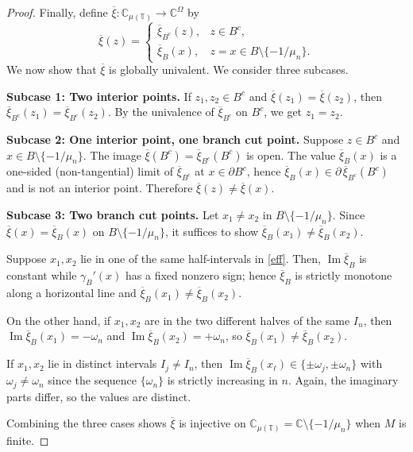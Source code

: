 \documentclass[10pt,a4paper]{amsart}
\numberwithin{equation}{section}
\begin{document}
\begin{proof}
Finally, define $\overline{\xi}:\mathbb{C}_{\mu(\mathbb{T})} \to \mathbb{C}^{\Omega}$ by
 $$
 \overline{\xi}(z)=
 \begin{cases}
 \overline{\xi}_{B^c}(z), & z\in B^c,\\[2pt]
 \overline{\xi}_B(x), & z=x\in B\setminus\{-1/\mu_n\}.
 \end{cases}
 $$
We now show that $\overline{\xi}$ is globally univalent. We consider three subcases.
\smallskip

\noindent\textbf{Subcase 1: Two interior points.}
If $z_1,z_2\in B^c$ and $\overline{\xi}(z_1)=\overline{\xi}(z_2)$, then
$\overline{\xi}_{B^c}(z_1)=\overline{\xi}_{B^c}(z_2)$. By the univalence of $\overline{\xi}_{B^c}$ on
$B^c$, we get $z_1=z_2$.
\smallskip

\noindent\textbf{Subcase 2: One interior point, one branch cut point.}
Suppose $z\in B^c$ and $x\in B\setminus\{-1/\mu_n\}$.
The image $\overline{\xi}(B^c)=\overline{\xi}_{B^c}(B^c)$ is open.
The value $\overline{\xi}_B(x)$ is a one-sided (non-tangential) limit of $\overline{\xi}_{B^c}$
at $x\in\partial B^c$,
hence $\overline{\xi}_B(x)\in\partial\,\overline{\xi}_{B^c}(B^c)$ and is not an interior point.
Therefore $\overline{\xi}(z)\neq \overline{\xi}(x)$.
\smallskip

\noindent\textbf{Subcase 3: Two branch cut points.}
Let $x_1\neq x_2$ in $B\setminus\{-1/\mu_n\}$. Since $\overline{\xi}(x)=\overline{\xi}_B(x)$ on
$B\setminus\{-1/\mu_n\}$, it suffices to show $\overline{\xi}_B(x_1)\neq \overline{\xi}_B(x_2)$.

Suppose $x_1,x_2$ lie in one of the same half-intervals in \eqref{eff}.
Then, $\operatorname{Im} \overline{\xi}_B$ is constant while $\gamma_B'(x)$ has a fixed nonzero sign;
 hence $\overline{\xi}_B$ is strictly monotone along a horizontal line and
$\overline{\xi}_B(x_1)\neq \overline{\xi}_B(x_2)$.

On the other hand, if $x_1,x_2$ are in the two different halves of the same $I_n$,
then $\operatorname{Im} \overline{\xi}_B(x_1)=-\omega_n$ and $\operatorname{Im} \overline{\xi}_B(x_2)=+\omega_n$, so
$\overline{\xi}_B(x_1)\neq \overline{\xi}_B(x_2)$.

If $x_1,x_2$ lie in distinct intervals $I_j\neq I_n$, then
$\operatorname{Im} \overline{\xi}_B(x_\ell)\in\{\pm \omega_j,\pm \omega_n\}$ with $\omega_j\neq \omega_n$
since the sequence $\{\omega_n\}$ is strictly increasing in $n$. Again, the imaginary
parts differ, so the values are distinct.

Combining the three cases shows $\overline{\xi}$ is injective on
$\mathbb{C}_{\mu(\mathbb{T})} = \mathbb{C}\setminus\{-1/\mu_n\}$ when $M$ is finite.
\smallskip


\end{proof}
\end{document}
